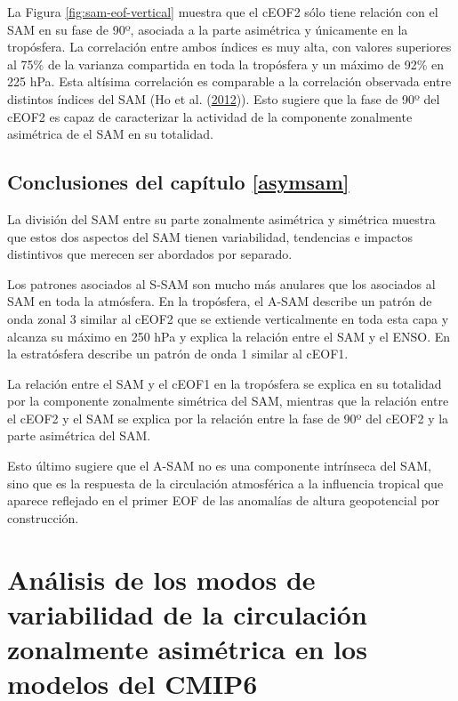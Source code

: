 \documentclass[12pt,oneside,a4paper]{reedthesis}
\begin{document}
La Figura \ref{fig:sam-eof-vertical} muestra que el cEOF2 sólo tiene relación con el SAM en su fase de 90º, asociada a la parte asimétrica y únicamente en la tropósfera.
La correlación entre ambos índices es muy alta, con valores superiores al 75\% de la varianza compartida en toda la tropósfera y un máximo de 92\% en 225 hPa.
Esta altísima correlación es comparable a la correlación observada entre distintos índices del SAM (Ho et al. (\protect\hyperlink{ref-ho2012}{2012})).
Esto sugiere que la fase de 90º del cEOF2 es capaz de caracterizar la actividad de la componente zonalmente asimétrica de el SAM en su totalidad.

\hypertarget{conclusiones-del-capuxedtulo-refasymsam}{%
\section{Conclusiones del capítulo \ref{asymsam}}\label{conclusiones-del-capuxedtulo-refasymsam}}

La división del SAM entre su parte zonalmente asimétrica y simétrica muestra que estos dos aspectos del SAM tienen variabilidad, tendencias e impactos distintivos que merecen ser abordados por separado.

Los patrones asociados al S-SAM son mucho más anulares que los asociados al SAM en toda la atmósfera.
En la tropósfera, el A-SAM describe un patrón de onda zonal 3 similar al cEOF2 que se extiende verticalmente en toda esta capa y alcanza su máximo en 250 hPa y explica la relación entre el SAM y el ENSO.
En la estratósfera describe un patrón de onda 1 similar al cEOF1.

La relación entre el SAM y el cEOF1 en la tropósfera se explica en su totalidad por la componente zonalmente simétrica del SAM, mientras que la relación entre el cEOF2 y el SAM se explica por la relación entre la fase de 90º del cEOF2 y la parte asimétrica del SAM.

Esto último sugiere que el A-SAM no es una componente intrínseca del SAM, sino que es la respuesta de la circulación atmosférica a la influencia tropical que aparece reflejado en el primer EOF de las anomalías de altura geopotencial por construcción.

\hypertarget{cmip6}{%
\chapter{Análisis de los modos de variabilidad de la circulación zonalmente asimétrica en los modelos del CMIP6}\label{cmip6}}
\end{document}
